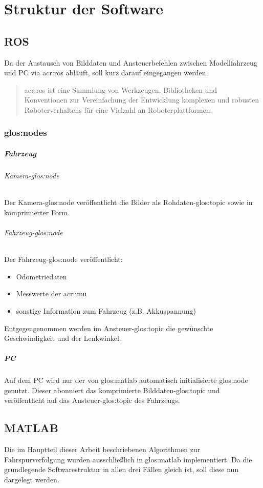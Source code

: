 \chapter{Struktur der Software}

\section{ROS}
Da der Austausch von Bilddaten und Ansteuerbefehlen zwischen Modellfahrzeug und PC via \gls{acr:ros} \autocite{ROSOrgPowering} abläuft, soll kurz darauf eingegangen werden. 
\begin{quotation}
\gls{acr:ros} ist eine Sammlung von Werkzeugen, Bibliotheken und Konventionen zur Vereinfachung der Entwicklung komplexen und robusten Roboterverhaltens für eine Vielzahl an Roboterplattformen. \autocite{ROSOrgROS}
\end{quotation}

\subsection{\glspl{glos:node}}
\paragraph{Fahrzeug}
\subparagraph{Kamera-\gls{glos:node}}
Der Kamera-\gls{glos:node} veröffentlicht die Bilder als Rohdaten-\gls{glos:topic} sowie in komprimierter Form.
\subparagraph{Fahrzeug-\gls{glos:node}}
Der Fahrzeug-\gls{glos:node} veröffentlicht:
\begin{itemize}
\item Odometriedaten 
\item Messwerte der \gls{acr:imu}
\item sonstige Information zum Fahrzeug (z.B. Akkuspannung)
\end{itemize}
Entgegengenommen werden im Ansteuer-\gls{glos:topic} die gewünschte Geschwindigkeit und der Lenkwinkel.
\paragraph{PC}
Auf dem PC wird nur der von \gls{glos:matlab} automatisch initialisierte \gls{glos:node} genutzt. Dieser abonniert das komprimierte Bilddaten-\gls{glos:topic} und veröffentlicht auf das Ansteuer-\gls{glos:topic} des Fahrzeugs.

\section{MATLAB}
Die im Hauptteil dieser Arbeit beschriebenen Algorithmen zur Fahrspurverfolgung wurden ausschließlich in \gls{glos:matlab} implementiert. Da die grundlegende Softwarestruktur in allen drei Fällen gleich ist, soll diese nun dargelegt werden.

